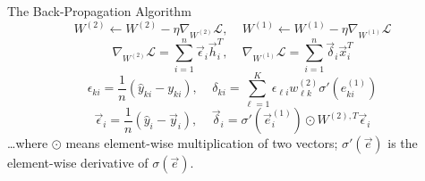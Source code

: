 \documentclass{beamer}
\begin{document}
\begin{frame}
  \begin{block}{The Back-Propagation Algorithm}
    \[
    W^{(2)}\leftarrow W^{(2)}-\eta\nabla_{W^{(2)}}{\mathcal L},~~~~~
    W^{(1)}\leftarrow W^{(1)}-\eta\nabla_{W^{(1)}}{\mathcal L}
    \]
    \[
    \nabla_{W^{(2)}}{\mathcal L}=\sum_{i=1}^n \vec\epsilon_i\vec{h}_i^T,~~~~~
    \nabla_{W^{(1)}}{\mathcal L}=\sum_{i=1}^n\vec\delta_i\vec{x}_i^T
    \]
    \[
    \epsilon_{ki}=\frac{1}{n} (\hat{y}_{ki}-y_{ki}),~~~~~
    \delta_{ki}=\sum_{\ell=1}^K \epsilon_{\ell i}w_{\ell k}^{(2)}\sigma'(e_{ki}^{(1)})
    \]
    \[
    \vec\epsilon_i=\frac{1}{n}\left(\hat{y}_i-\vec{y}_i\right),~~~~~
    \vec\delta_i=\sigma'(\vec{e}_i^{(1)})\odot W^{(2),T}\vec\epsilon_i
    \]
    \ldots where $\odot$ means element-wise multiplication of two
    vectors; $\sigma'(\vec{e})$ is the element-wise
    derivative of $\sigma(\vec{e})$.
  \end{block}
\end{frame}
\end{document}
